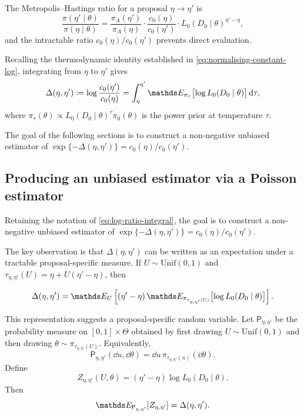 The Metropolis--Hastings ratio for a proposal $\eta \to \eta'$ is
\begin{equation}
    \frac{\pi(\eta' \mid \theta)}{\pi(\eta \mid \theta)}
    =
    \frac{\pi_A(\eta')}{\pi_A(\eta)}
    \cdot
    \frac{c_0(\eta)}{c_0(\eta')}
    \cdot
    L_0(D_0 \mid \theta)^{\eta' - \eta},
\end{equation}
and the intractable ratio $c_0(\eta)/c_0(\eta')$ prevents direct evaluation.

Recalling the thermodynamic identity established in \eqref{eq:normalising-constant-log}, integrating from $\eta$ to $\eta'$ gives
\begin{equation}
    \label{eq:log-ratio-integral}
    \Delta(\eta, \eta')
    \coloneqq
    \log\frac{c_0(\eta')}{c_0(\eta)}
    =
    \int_{\eta}^{\eta'}
    \bE_{\pi_\tau}\bigl[\log L_0(D_0 \mid \theta)\bigr]
    \,\dd\tau,
\end{equation}
where $\pi_\tau(\theta) \propto L_0(D_0 \mid \theta)^\tau \pi_0(\theta)$ is the power prior at temperature $\tau$.

The goal of the following sections is to construct a non-negative unbiased estimator of $\exp\{-\Delta(\eta,\eta')\} = c_0(\eta)/c_0(\eta')$.


\subsection{Producing an unbiased estimator via a Poisson estimator}
\label{subsec:poisson-estimator}

Retaining the notation of \eqref{eq:log-ratio-integral}, the goal is to construct a non-negative unbiased estimator of $\exp\{-\Delta(\eta,\eta')\} = c_0(\eta)/c_0(\eta')$.

The key observation is that $\Delta(\eta,\eta')$ can be written as an expectation under a tractable proposal-specific measure.
If $U\sim\mathrm{Unif}(0,1)$ and $\tau_{\eta,\eta'}(U)=\eta+U(\eta'-\eta)$, then

\begin{equation}
    \Delta(\eta,\eta')
    =
    \bE_{U}
    \left[
        (\eta'-\eta)\,
        \bE_{\pi_{\tau_{\eta,\eta'}(U)}}
        \bigl[\log L_0(D_0\mid \theta)\bigr]
    \right].
\end{equation}

This representation suggests a proposal-specific random variable.
Let $\mathsf P_{\eta,\eta'}$ be the probability measure on $[0,1]\times\Theta$ obtained by first drawing $U\sim\mathrm{Unif}(0,1)$ and then drawing $\theta\sim\pi_{\tau_{\eta,\eta'}(U)}$.
Equivalently,
\begin{equation}
    \mathsf P_{\eta,\eta'}(\dd u,\dd\theta)
    =
    \dd u\,
    \pi_{\tau_{\eta,\eta'}(u)}(\dd\theta).
\end{equation}
Define
\begin{equation}
    Z_{\eta,\eta'}(U,\theta)
    =
    (\eta'-\eta)\log L_0(D_0\mid \theta).
\end{equation}
Then
\begin{equation}
    \bE_{\mathsf P_{\eta,\eta'}}[Z_{\eta,\eta'}]
    =
    \Delta(\eta,\eta').
\end{equation}

